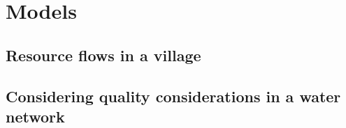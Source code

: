\section{Models}
\label{sec:models}

\subsection{Resource flows in a village}

\subsection{Considering quality considerations in a water network}

